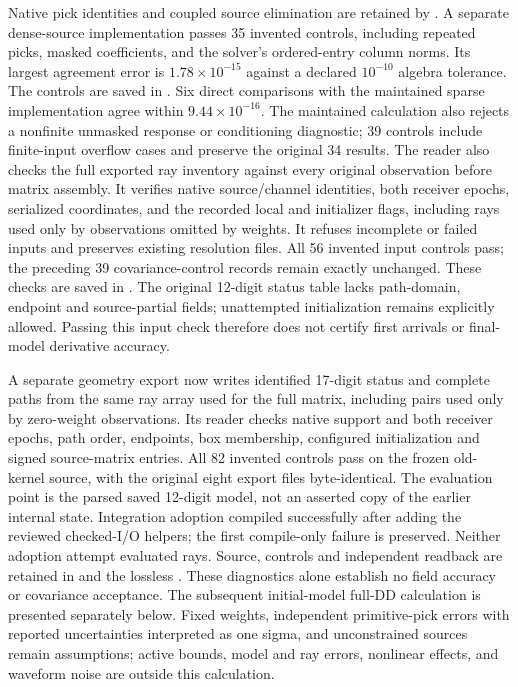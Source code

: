 Native pick identities and coupled source elimination are retained by
. A separate
dense-source implementation passes 35 invented controls, including repeated
picks, masked coefficients, and the solver's ordered-entry column norms.
Its largest agreement error is $1.78\times10^{-15}$ against a declared
$10^{-10}$ algebra tolerance. The controls are saved in
.
Six direct comparisons with the maintained sparse implementation agree within
$9.44\times10^{-16}$. The maintained calculation also rejects a nonfinite
unmasked response or conditioning diagnostic; 39 controls include finite-input
overflow cases and preserve the original 34 results.
The reader also checks the full exported ray inventory against every original
observation before matrix assembly. It verifies native source/channel identities,
both receiver epochs, serialized coordinates, and the recorded local and
initializer flags, including rays used only by observations omitted by weights.
It refuses incomplete or failed inputs and preserves existing resolution files.
All 56 invented input controls pass; the preceding 39 covariance-control records
remain exactly unchanged. These checks are saved in
.
The original 12-digit status table lacks path-domain, endpoint and source-partial fields;
unattempted initialization remains explicitly allowed. Passing this input check
therefore does not certify first arrivals or final-model derivative accuracy.

A separate geometry export now writes identified 17-digit status and complete
paths from the same ray array used for the full matrix, including pairs used
only by zero-weight observations. Its reader checks native support and both
receiver epochs, path order, endpoints, box membership, configured
initialization and signed source-matrix entries. All 82 invented controls
pass on the frozen old-kernel source, with the original eight export files
byte-identical. The evaluation point is the parsed saved 12-digit model,
not an asserted copy of the earlier
internal state. Integration adoption compiled successfully after adding the
reviewed checked-I/O helpers; the first compile-only failure is preserved.
Neither adoption attempt evaluated rays. Source, controls and independent
readback are retained in
and the lossless
.
These diagnostics alone establish no field accuracy or covariance acceptance.
The subsequent initial-model full-DD calculation is presented separately below.
Fixed weights, independent primitive-pick errors with reported uncertainties
interpreted as one sigma, and unconstrained sources remain assumptions; active
bounds, model and ray errors, nonlinear effects, and waveform noise are outside
this calculation.
